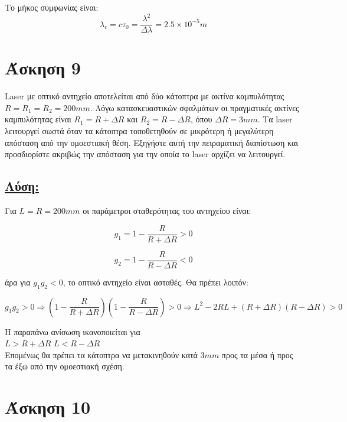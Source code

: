 \documentclass[a4paper,11pt,titlepage]{article}
\begin{document}
Το μήκος συμφωνίας είναι:
\begin{equation}
 \lambda_c=c\tau_0=\frac{\lambda^2}{\Delta\lambda}=2.5\times10^{-5}m
\end{equation}


\section{Άσκηση 9}

Laser με οπτικό αντηχείο αποτελείται από δύο κάτοπτρα με ακτίνα καμπυλότητας $R=R_1=R_2=200mm$. Λόγω κατασκευαστικών σφαλμάτων οι πραγματικές ακτίνες καμπυλότητας είναι $R_1=R+{\Delta}R$  και $R_2=R-{\Delta}R$, όπου ${\Delta}R=3mm$. Τα laser λειτουργεί σωστά όταν τα κάτοπτρα τοποθετηθούν σε μικρότερη ή μεγαλύτερη απόσταση από την ομοεστιακή θέση. Εξηγήστε αυτή την πειραματική διαπίστωση και προσδιορίστε ακριβώς την απόσταση για την οποία το laser αρχίζει να λειτουργεί.

\subsection*{\underline{Λύση:}}
Για $L=R=200mm$ οι παράμετροι σταθερότητας του αντηχείου είναι:


\begin{equation}
 g_1=1-\frac{R}{R+{\Delta}R}>0
\end{equation} 

 \begin{equation}
 g_2=1-\frac{R}{R-{\Delta}R}<0
\end{equation} 

άρα για $g_1g_2<0$, το οπτικό αντηχείο είναι ασταθές. Θα πρέπει λοιπόν:

\begin{equation}
 g_1g_2>0\Rightarrow(1-\frac{R}{R+{\Delta}R})(1-\frac{R}{R-{\Delta}R})>0\Rightarrow L^2-2RL+({R+{\Delta}R})({R-{\Delta}R})>0
\end{equation}

Η παραπάνω ανίσωση ικανοποιείται για \\

$L>R+\Delta R$
$L<R-\Delta R$
\\
Επομένως θα πρέπει τα κάτοπτρα να μετακινηθούν κατά $3mm$ προς τα μέσα ή προς τα έξω από την ομοεστιακή σχέση.

\section{Άσκηση 10}
\end{document}
